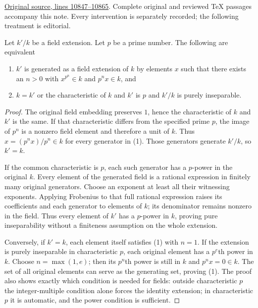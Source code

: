 \hypertarget{algebra-context-130}{}

\noindent\href{https://github.com/stacks/stacks-project/blob/a04446e57ec1fbc252a871afcec7752fb2807b14/algebra.tex\#L10847}{Original source, lines 10847--10865}. Complete original and reviewed TeX passages accompany this note. Every intervention is separately recorded; the following treatment is editorial.


\begin{lemma}
\label{editorial-source-lemma-p-ring-map-field}
Let $k'/k$ be a field extension. Let $p$ be a prime number.
The following are equivalent
\begin{enumerate}
\item $k'$ is generated as a field extension of $k$ by elements
$x$ such that there exists an $n > 0$ with $x^{p^n} \in k$ and
$p^nx \in k$, and
\item $k = k'$ or the characteristic of $k$
and $k'$ is $p$ and $k'/k$ is purely inseparable.
\end{enumerate}
\end{lemma}

\begin{proof}
The original field embedding preserves $1$, hence
the characteristic of $k$ and $k'$ is the
same. If that characteristic differs from
the specified prime $p$, the image of
$p^n$ is a nonzero field element and
therefore a unit of $k$. Thus
$x=(p^n x)/p^n\in k$ for every generator
in (1). Those generators generate $k'/k$,
so $k'=k$.

If the common characteristic is $p$,
each such generator has a $p$-power
in the original $k$. Every element
of the generated field is a rational
expression in finitely many original
generators. Choose an exponent at
least all their witnessing exponents.
Applying Frobenius to that full
rational expression raises its
coefficients and each generator to
elements of $k$; its denominator
remains nonzero in the field.
Thus every element of $k'$ has a
$p$-power in $k$, proving pure
inseparability without a finiteness
assumption on the whole extension.

Conversely, if $k'=k$, each element
itself satisfies (1) with $n=1$.
If the extension is purely
inseparable in characteristic $p$,
each original element has a
$p^e$th power in $k$. Choose
$n=\max(1,e)$; then its $p^n$th
power is still in $k$ and
$p^n x=0\in k$. The set of all
original elements can serve as
the generating set, proving (1).
The proof also shows exactly
which condition is needed for
fields: outside characteristic
$p$ the integer-multiple condition
alone forces the identity extension;
in characteristic $p$ it is automatic,
and the power condition is sufficient.
\end{proof}


